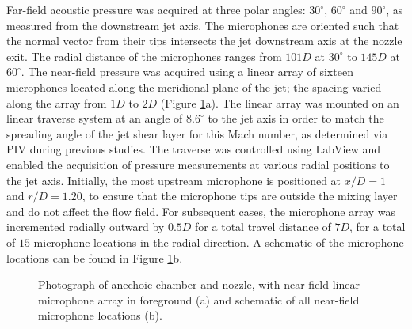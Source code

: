 \documentclass[english]{aiaa-tc}
\begin{document}
Far-field acoustic pressure was acquired at three polar angles: $30^{\circ}$, $60^{\circ}$ and $90^{\circ}$, as measured from the downstream jet axis. The microphones are oriented such that the normal vector from their tips intersects the jet downstream axis at the nozzle exit. The radial distance of the microphones ranges from $101D$ at $30^{\circ}$ to $145D$ at $60^{\circ}$. The near-field pressure was acquired using a linear array of sixteen microphones located along the meridional plane of the jet; the spacing varied along the array from $1D$ to $2D$ (Figure \ref{GDTLsetup}a). The linear array was mounted on an linear traverse system at an angle of $8.6^{\circ}$ to the jet axis in order to match the spreading angle of the jet shear layer for this Mach number, as determined via PIV during previous studies\cite{kfm2009-1}. The traverse was controlled using LabView and enabled the acquisition of pressure measurements at various radial positions to the jet axis. Initially, the most upstream microphone is positioned at $x/D = 1$ and $r/D = 1.20$, to ensure that the microphone tips are outside the mixing layer and do not affect the flow field. For subsequent cases, the microphone array was incremented radially outward by $0.5D$ for a total travel distance of $7D$, for a total of $15$ microphone locations in the radial direction. A schematic of the microphone locations can be found in Figure \ref{GDTLsetup}b.
\begin{figure}

	\centering{}\caption{Photograph of anechoic chamber and nozzle, with near-field linear microphone array in foreground (a) and schematic of all near-field microphone locations (b).}\label{GDTLsetup}
\end{figure}
\end{document}
